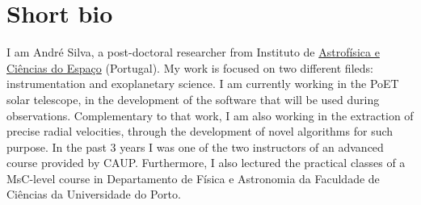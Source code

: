\documentclass[11pt,a4paper,sans]{moderncv}
\begin{document}
\makecvtitle

\section{Short bio}

I am André Silva, a post-doctoral researcher from Instituto de \href{https://www.iastro.pt/}{Astrofísica e Ciências do Espaço} (Portugal). My work is focused on two different fileds: instrumentation and exoplanetary science. I am currently working in the PoET solar telescope, in the development of the software that will be used during observations. Complementary to that work, I am also working in the extraction of precise radial velocities, through the development of novel algorithms for such purpose. In the past 3 years I was one of the two instructors of an advanced course provided by CAUP. Furthermore, I also lectured the practical classes of a MsC-level course in Departamento de Física e Astronomia da Faculdade de Ciências da Universidade do Porto.











 
% 
\end{document}
